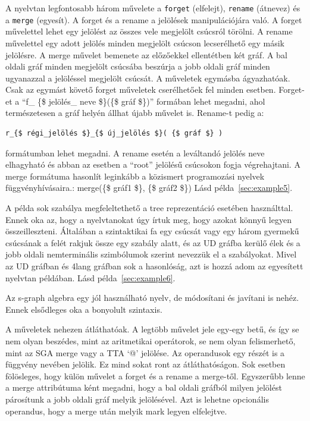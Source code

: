 A nyelvtan legfontosabb három művelete a \texttt{forget} (elfelejt), \texttt{rename} (átnevez) és a \texttt{merge} (egyesít). A forget és a rename a jelölések manipulációjára való. A forget művelettel lehet egy jelölést az összes vele megjelölt csúcsról törölni. A rename művelettel egy adott jelölés minden megjelölt csúcson lecserélhető egy másik jelölésre. A merge művelet bemenete az előzőekkel ellentétben két gráf. A bal oldali gráf minden megjelölt csúcsába beszúrja a jobb oldali gráf minden ugyanazzal a jelöléssel megjelölt csúcsát. A műveletek egymásba ágyazhatóak. Csak az egymást követő forget műveletek cserélhetőek fel minden esetben. Forget-et a “f\_ \{\$ jelölés\_ neve \$\}(\{\$ gráf \$\})”
 formában lehet megadni, ahol természetesen a gráf helyén állhat újabb művelet is.  Rename-t pedig a:
\begin{verbatim}
r_{$ régi_jelölés $}_{$ új_jelölés $}( {$ gráf $} )
\end{verbatim}
formátumban lehet megadni. A rename esetén a leváltandó jelölés neve elhagyható és abban az esetben a “root” jelölésű csúcsokon fogja végrehajtani. A merge formátuma hasonlít leginkább a közismert programozási nyelvek függvényhívásaira.: merge(\{\$ gráf1 \$\}, \{\$ gráf2 \$\}) Lásd példa~\ref{sec:example5}.

A példa sok szabálya megfeleltethető a tree reprezentáció esetében használttal. Ennek oka az, hogy a nyelvtanokat úgy írtuk meg, hogy azokat könnyű legyen összeilleszteni. Általában a szintaktikai fa egy csúcsát vagy egy három gyermekű csúcsának a felét rakjuk össze egy szabály alatt, és az UD gráfba kerülő élek és a jobb oldali nemterminális szimbólumok szerint nevezzük el a szabályokat. Mivel az UD gráfban és 4lang gráfban sok a hasonlóság, azt is hozzá adom az egyesített nyelvtan példában. Lásd példa~\ref{sec:example6}.

Az s-graph algebra egy jól használható nyelv, de módosítani és javítani is nehéz. Ennek elsődleges oka a bonyolult szintaxis.

A műveletek nehezen átláthatóak. A legtöbb művelet jele egy-egy betű, és így se nem olyan beszédes, mint az aritmetikai operátorok, se nem olyan felismerhető, mint az SGA merge vagy a TTA ‘@’ jelölése. Az operandusok egy részét is a függvény nevében jelölik.  Ez mind sokat ront az átláthatóságon. Sok esetben fölösleges, hogy külön művelet a forget és a rename a merge-től. Egyszerűbb lenne a merge attribútuma ként megadni, hogy a bal oldali gráfból milyen jelölést párosítunk a jobb oldali gráf melyik jelölésével. Azt is lehetne opcionális operandus, hogy a merge után melyik mark legyen elfelejtve.

